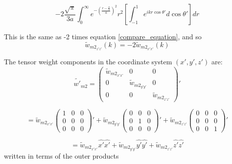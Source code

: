 \documentclass[double,12pt]{beavtex}
\begin{document}
\begin{equation}{-2\frac{\sqrt{\pi}}{3a}\int_{0}^{\infty}e^{-\left(\frac{r-\frac{\alpha}{2}}{a}\right)^2}r^2\left[\int_{-1}^{1}e^{ikr\cos\theta'}d{\cos\theta'}\right]d{r}}\end{equation} 

This is the same as -2 times equation \ref{compare_equation}, and so \begin{equation}{\widetilde{w}_{{m2}_{z'z'}}(k)=-2\widetilde{w}_{{m2}_{x'x'}}(k)}\end{equation}

\noindent The tensor weight components in the coordinate system 
$(x',y',z')$ are:
\begin{equation}\label{tensorcomp}{\widetilde{w'}_{m2}=\left(\begin{array}{ccc} \widetilde{w}_{{m2}_{x'x'}} & 0 & 0 \\ 0 & \widetilde{w}_{{m2}_{y'y'}} & 0 \\ 0 & 0 & \widetilde{w}_{{m2}_{z'z'}} \end{array}\right)'}\end{equation}

\begin{displaymath}{=\widetilde{w}_{{m2}_{x'x'}}\left(\begin{array}{ccc} 1 & 0 & 0 \\ 0 & 0 & 0 \\ 0 & 0 & 0 \end{array}\right)'+ \widetilde{w}_{{m2}_{y'y'}}\left(\begin{array}{ccc} 0 & 0 & 0 \\ 0 & 1 & 0 \\ 0 & 0 & 0 \end{array}\right)' + \widetilde{w}_{{m2}_{z'z'}}\left(\begin{array}{ccc} 0 & 0 & 0 \\ 0 & 0 & 0 \\ 0 & 0 & 1 \end{array}\right)'}\end{displaymath}

\begin{equation}{=\widetilde{w}_{{m2}_{x'x'}}\hat{x'}\hat{x'}+\widetilde{w}_{{m2}_{y'y'}}\hat{y'}\hat{y'}+\widetilde{w}_{{m2}_{z'z'}}\hat{z'}\hat{z'}}\end{equation}
written in terms of the outer products
\end{document}
